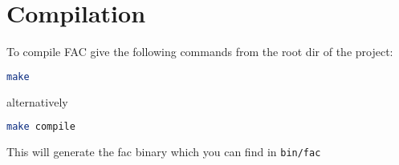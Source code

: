 \section{Compilation}

To compile FAC give the following commands from the root dir of the project:
\begin{lstlisting}[language=bash,
caption={FAC compilation},captionpos=b,frame=single]
make
\end{lstlisting}
alternatively
\begin{lstlisting}[language=bash,
caption={FAC compilation (explicit)},captionpos=b,frame=single]
make compile
\end{lstlisting}
This will generate the fac binary which you can find in \verb|bin/fac|
